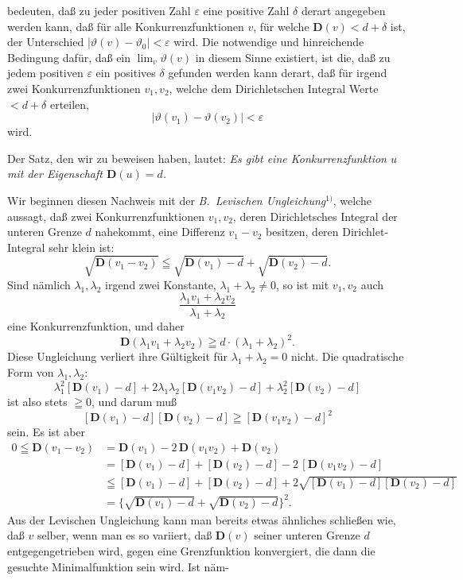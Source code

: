 \documentclass{article}
\begin{document}
bedeuten, daß zu jeder positiven Zahl $\varepsilon$ eine positive Zahl $\delta$ derart angegeben werden kann, daß für alle Konkurrenzfunktionen $v$, für welche $\mathbf{D}(v) < d + \delta$ ist, der Unterschied $|\vartheta(v) - \vartheta_0| < \varepsilon$ wird. Die notwendige und hinreichende Bedingung dafür, daß ein $\lim_v \vartheta(v)$ in diesem Sinne existiert, ist die, daß zu jedem positiven $\varepsilon$ ein positives $\delta$ gefunden werden kann derart, daß für irgend zwei Konkurrenzfunktionen $v_1, v_2$, welche dem Dirichletschen Integral Werte $< d + \delta$ erteilen,
\[ |\vartheta(v_1) - \vartheta(v_2)| < \varepsilon \]
wird.

Der Satz, den wir zu beweisen haben, lautet: \emph{Es gibt eine Konkurrenzfunktion $u$ mit der Eigenschaft $\mathbf{D}(u) = d$.}

Wir beginnen diesen Nachweis mit der \emph{B.~Levischen Ungleichung}${}^{1)}$, welche aussagt, daß zwei Konkurrenzfunktionen $v_1, v_2$, deren Dirichletsches Integral der unteren Grenze $d$ nahekommt, eine Differenz $v_1 - v_2$ besitzen, deren Dirichlet-Integral sehr klein ist:
\[ \sqrt{\mathbf{D}(v_1 - v_2)} \leqq \sqrt{\mathbf{D}(v_1) - d} + \sqrt{\mathbf{D}(v_2) - d}. \]
Sind nämlich $\lambda_1, \lambda_2$ irgend zwei Konstante, $\lambda_1 + \lambda_2 \neq 0$, so ist mit $v_1, v_2$ auch
\[ \frac{\lambda_1 v_1 + \lambda_2 v_2}{\lambda_1 + \lambda_2} \]
eine Konkurrenzfunktion, und daher
\[ \mathbf{D}(\lambda_1 v_1 + \lambda_2 v_2) \geqq d \cdot (\lambda_1 + \lambda_2)^2. \]
Diese Ungleichung verliert ihre Gültigkeit für $\lambda_1 + \lambda_2 = 0$ nicht. Die quadratische Form von $\lambda_1, \lambda_2$:
\[ \lambda_1^2 [\mathbf{D}(v_1) - d] + 2\lambda_1 \lambda_2 [\mathbf{D}(v_1 v_2) - d] + \lambda_2^2 [\mathbf{D}(v_2) - d] \]
ist also stets $\geqq 0$, und darum muß
\[ [\mathbf{D}(v_1) - d][\mathbf{D}(v_2) - d] \geqq [\mathbf{D}(v_1 v_2) - d]^2 \]
sein. Es ist aber
\[ \begin{aligned}
0 \leqq \mathbf{D}(v_1 - v_2) &= \mathbf{D}(v_1) - 2\,\mathbf{D}(v_1 v_2) + \mathbf{D}(v_2) \\
&= [\mathbf{D}(v_1) - d] + [\mathbf{D}(v_2) - d] - 2\,[\mathbf{D}(v_1 v_2) - d] \\
&\leqq [\mathbf{D}(v_1) - d] + [\mathbf{D}(v_2) - d] + 2\sqrt{[\mathbf{D}(v_1) - d][\mathbf{D}(v_2) - d]} \\
&= \bigl\{ \sqrt{\mathbf{D}(v_1) - d} + \sqrt{\mathbf{D}(v_2) - d} \bigr\}^2.
\end{aligned} \]
Aus der Levischen Ungleichung kann man bereits etwas ähnliches schließen wie, daß $v$ selber, wenn man es so variiert, daß $\mathbf{D}(v)$ seiner unteren Grenze $d$ entgegengetrieben wird, gegen eine Grenzfunktion konvergiert, die dann die gesuchte Minimalfunktion sein wird. Ist näm-
\end{document}
